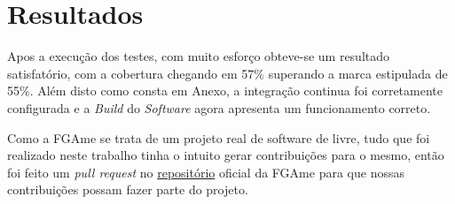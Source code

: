 \chapter{Resultados}

Apos a execução dos testes, com muito esforço obteve-se um resultado satisfatório, com a cobertura chegando em 57\% superando a marca estipulada de 55\%. Além disto como consta em Anexo, a integração continua foi corretamente configurada e a \textit{Build} do \textit{Software} agora apresenta um funcionamento correto.

Como a FGAme se trata de um projeto real de software de livre, tudo que foi realizado neste trabalho tinha o intuito gerar contribuições para o mesmo, então foi feito um \textit{pull request} no  \href{https://github.com/fabiommendes/FGAme}{repositório} oficial da FGAme para que nossas contribuições possam fazer parte do projeto.